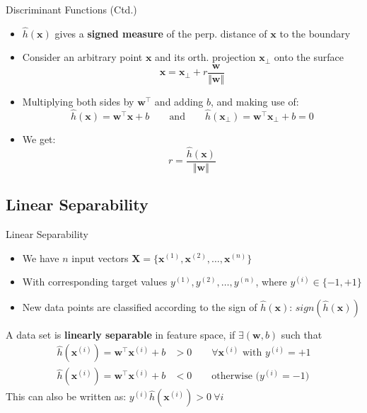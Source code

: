 \begin{frame}{Discriminant Functions (Ctd.)}{}
	\begin{itemize}
		\item $\widehat{h}(\bm{x})$ gives a \textbf{signed measure} of the perp. distance of $\bm{x}$ to the boundary
		\item Consider an arbitrary point $\bm{x}$ and its orth. projection $\bm{x}_{\perp}$ onto the surface
		\begin{equation}
			\bm{x} = \bm{x}_{\perp} + r \frac{\bm{w}}{\Vert \bm{w} \Vert}
		\end{equation}
		\item Multiplying both sides by $\bm{w}^{\intercal}$ and adding $b$, and making use of:
		\begin{equation*}
			\widehat{h}(\bm{x})
				= \bm{w}^{\intercal} \bm{x} + b \qquad \text{and} \qquad
			\widehat{h}(\bm{x}_{\perp})
				= \bm{w}^{\intercal} \bm{x}_{\perp} + b = 0			
		\end{equation*}
		\item We get:
		\begin{equation}
			r = \frac{\widehat{h}(\bm{x})}{\Vert \bm{w} \Vert}
		\end{equation}
	\end{itemize}
\end{frame}


\subsection{Linear Separability}

\begin{frame}{Linear Separability}{}
	\begin{itemize}
		\item We have $n$ input vectors $\bm{X} = \{ \bm{x}^{(1)}, \bm{x}^{(2)}, \dots, \bm{x}^{(n)} \}$
		\item With corresponding target values $y^{(1)}, y^{(2)}, \dots, y^{(n)}$, where $y^{(i)} \in \{-1, +1\}$
		\item New data points are classified according to the sign of $\widehat{h}(\bm{x})$: $sign(\widehat{h}(\bm{x}))$
	\end{itemize}
	
	\begin{boxBlueNoFrame}
		\footnotesize
		A data set is \textbf{linearly separable} in feature space, if $\exists (\bm{w}, b)$ such that
		\begin{align}
			\widehat{h}(\bm{x}^{(i)}) = \bm{w}^{\intercal} \bm{x}^{(i)} + b &> 0 \qquad
				\text{$\forall \bm{x}^{(i)}$ with $y^{(i)} = +1$} \\
			\widehat{h}(\bm{x}^{(i)}) = \bm{w}^{\intercal} \bm{x}^{(i)} + b &< 0 \qquad
				\text{otherwise ($y^{(i)} = -1$)}
		\end{align}
		This can also be written as: $y^{(i)} \widehat{h}(\bm{x}^{(i)}) > 0\ \forall i$ 
	\end{boxBlueNoFrame}
\end{frame}


